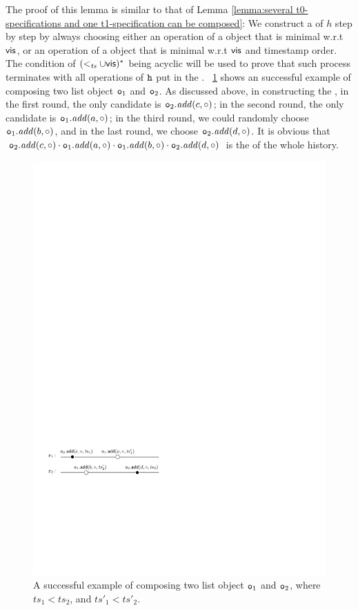 The proof of this lemma is similar to that of Lemma \ref{lemma:several t0-specifications and one t1-specification can be composed}: We construct a \crdtlinearization of $h$ step by step by always choosing either an operation of a \tzerolin{} object that is minimal w.r.t $\mathsf{vis}$, or an operation of a \tonelin{} object that is minimal w.r.t $\mathsf{vis}$ and timestamp order. The condition of $(<_{\mathit{ts}} \cup \mathsf{vis})^*$ being acyclic will be used to prove that such process terminates with all operations of $\mathtt{h}$ put in the \crdtlinearization. \figurename~\ref{fig:compose two list} shows an successful example of composing two \tonelinearizable list object $\mathtt{o}_1$ and $\mathtt{o}_2$. As discussed above, in constructing the \crdtlinearization, in the first round, the only candidate is $\mathtt{o}_2.\mathit{add}(c,\circ)$; in the second round, the only candidate is $\mathtt{o}_1.\mathit{add}(a,\circ)$; in the third round, we could randomly choose $\mathtt{o}_1.\mathit{add}(b,\circ)$, and in the last round, we choose $\mathtt{o}_2.\mathit{add}(d,\circ)$. It is obvious that  $\mathtt{o}_2.\mathit{add}(c,\circ) \cdot \mathtt{o}_1.\mathit{add}(a,\circ) \cdot \mathtt{o}_1.\mathit{add}(b,\circ) \cdot \mathtt{o}_2.\mathit{add}(d,\circ)$ is the \crdtlinearization of the whole history.

\begin{figure}[t]
  \centering
  \includegraphics[width=0.45 \textwidth]{figures/Compose-TwoList.pdf}
\vspace{-10pt}
  \caption{A successful example of composing two \tonelinearizable list object $\mathtt{o}_1$ and $\mathtt{o}_2$, where $\mathit{ts}_1 < \mathit{ts}_2$, and $\mathit{ts}'_1 < \mathit{ts}'_2$.}
  \label{fig:compose two list}
\end{figure}

